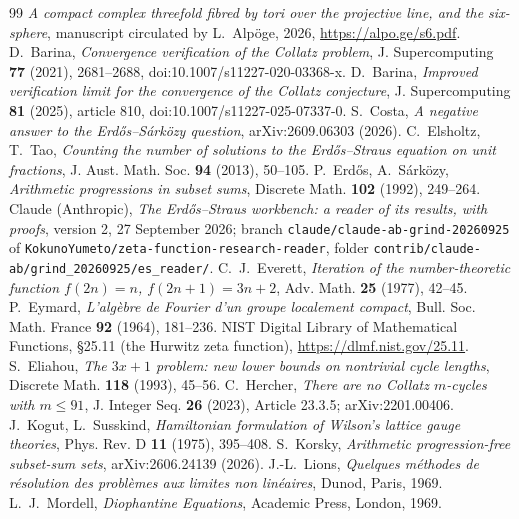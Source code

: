 \begin{thebibliography}{99}
\small
{} \emph{A compact complex threefold fibred by tori over the projective line, and the six-sphere}, manuscript circulated by L.~Alpöge, 2026, \url{https://alpo.ge/s6.pdf}.
 D.~Barina, \emph{Convergence verification of the Collatz problem}, J. Supercomputing \textbf{77} (2021), 2681--2688, doi:10.1007/s11227-020-03368-x.
 D.~Barina, \emph{Improved verification limit for the convergence of the Collatz conjecture}, J. Supercomputing \textbf{81} (2025), article 810, doi:10.1007/s11227-025-07337-0.
 S.~Costa, \emph{A negative answer to the Erdős--Sárközy question}, arXiv:2609.06303 (2026).
 C.~Elsholtz, T.~Tao, \emph{Counting the number of solutions to the Erdős--Straus equation on unit fractions}, J. Aust. Math. Soc. \textbf{94} (2013), 50--105.
 P.~Erdős, A.~Sárközy, \emph{Arithmetic progressions in subset sums}, Discrete Math. \textbf{102} (1992), 249--264.
 Claude (Anthropic), \emph{The Erdős--Straus workbench: a reader of its results, with proofs}, version 2, 27 September 2026; branch \texttt{claude/claude-ab-grind-20260925} of \texttt{KokunoYumeto/zeta-function-research-reader}, folder \texttt{contrib/claude-ab/grind\_20260925/es\_reader/}.
 C.~J.~Everett, \emph{Iteration of the number-theoretic function $f(2n)=n$, $f(2n+1)=3n+2$}, Adv. Math. \textbf{25} (1977), 42--45.
 P.~Eymard, \emph{L'algèbre de Fourier d'un groupe localement compact}, Bull. Soc. Math. France \textbf{92} (1964), 181--236.
 NIST Digital Library of Mathematical Functions, §25.11 (the Hurwitz zeta function), \url{https://dlmf.nist.gov/25.11}.
 S.~Eliahou, \emph{The $3x+1$ problem: new lower bounds on nontrivial cycle lengths}, Discrete Math. \textbf{118} (1993), 45--56.
 C.~Hercher, \emph{There are no Collatz $m$-cycles with $m\le91$}, J. Integer Seq. \textbf{26} (2023), Article 23.3.5; arXiv:2201.00406.
 J.~Kogut, L.~Susskind, \emph{Hamiltonian formulation of Wilson's lattice gauge theories}, Phys. Rev. D \textbf{11} (1975), 395--408.
 S.~Korsky, \emph{Arithmetic progression-free subset-sum sets}, arXiv:2606.24139 (2026).
 J.-L.~Lions, \emph{Quelques méthodes de résolution des problèmes aux limites non linéaires}, Dunod, Paris, 1969.
 L.~J.~Mordell, \emph{Diophantine Equations}, Academic Press, London, 1969.

\end{thebibliography}
